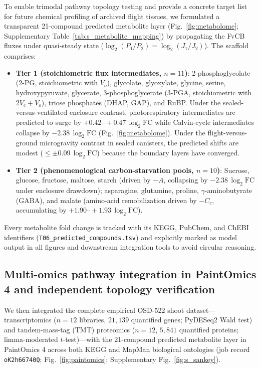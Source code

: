 \documentclass[10pt,twocolumn,a4paper]{article}
\begin{document}
To enable trimodal pathway topology testing and provide a concrete target list for future chemical profiling of archived flight tissues, we formulated a transparent 21-compound predicted metabolite layer (Fig.~\ref{fig:metabolome}; Supplementary Table~\ref{tab:s_metabolite_mapping}) by propagating the FvCB fluxes under quasi-steady state ($\log_2(P_1/P_2) = \log_2(J_1/J_2)$). The scaffold comprises:
\begin{itemize}
    \item \textbf{Tier 1 (stoichiometric flux intermediates, $n=11$)}: 2-phosphoglycolate (2-PG, stoichiometric with $V_o$), glycolate, glyoxylate, glycine, serine, hydroxypyruvate, glycerate, 3-phosphoglycerate (3-PGA, stoichiometric with $2V_c+V_o$), triose phosphates (DHAP, GAP), and RuBP. Under the sealed-versus-ventilated enclosure contrast, photorespiratory intermediates are predicted to surge by $+0.42\text{--}+0.47\,\log_2\mathrm{FC}$ while Calvin-cycle intermediates collapse by $-2.38\,\log_2\mathrm{FC}$ (Fig.~\ref{fig:metabolome}). Under the flight-versus-ground microgravity contrast in sealed canisters, the predicted shifts are modest ($\le \pm 0.09\,\log_2\mathrm{FC}$) because the boundary layers have converged.
    \item \textbf{Tier 2 (phenomenological carbon-starvation pools, $n=10$)}: Sucrose, glucose, fructose, maltose, starch (driven by $-A$, collapsing by $-2.38\,\log_2\mathrm{FC}$ under enclosure drawdown); asparagine, glutamine, proline, $\gamma$-aminobutyrate (GABA), and malate (amino-acid remobilization driven by $-C_c$, accumulating by $+1.90\text{--}+1.93\,\log_2\mathrm{FC}$).
\end{itemize}

Every metabolite fold change is tracked with its KEGG, PubChem, and ChEBI identifiers (\texttt{T06\_predicted\_compounds.tsv}) and explicitly marked as model output in all figures and downstream integration tools to avoid circular reasoning.

\subsection*{Multi-omics pathway integration in PaintOmics 4 and independent topology verification}\label{sec:paintomics}

We then integrated the complete empirical OSD-522 shoot dataset---transcriptomics ($n=12$ libraries, $21{,}139$ quantified genes; PyDESeq2 Wald test) and tandem-mass-tag (TMT) proteomics ($n=12$, $5{,}841$ quantified proteins; limma-moderated $t$-test)---with the 21-compound predicted metabolite layer in PaintOmics 4 \citep{paintomics4} across both KEGG and MapMan biological ontologies (job record \texttt{oK2h66740Q}; Fig.~\ref{fig:paintomics}; Supplementary Fig.~\ref{fig:s_sankey}).
\end{document}
